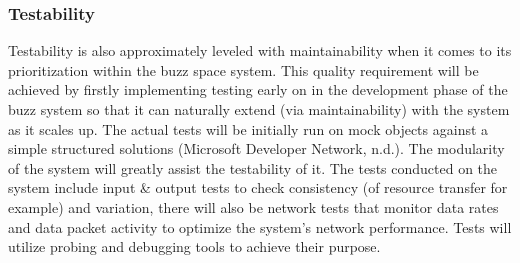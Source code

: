 \subsubsection{Testability}
Testability is also approximately leveled with maintainability when it comes to its prioritization within the buzz space system. This quality requirement will be achieved by firstly implementing testing early on in the development phase of the buzz system so that it can naturally extend (via maintainability) with the system as it scales up. The actual tests will be initially run on mock objects against a simple structured solutions (Microsoft Developer Network, n.d.). The modularity of the system will greatly assist the testability of it. The tests conducted on the system include input & output tests to check consistency (of resource transfer for example) and variation, there will also be network tests that monitor data rates and data packet activity to optimize the system’s network performance. Tests will utilize probing and debugging tools to achieve their purpose.\\